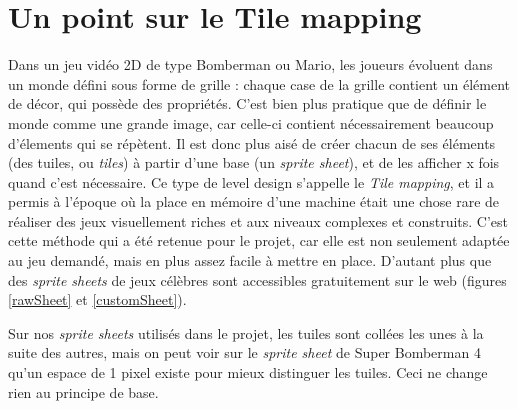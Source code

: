 \documentclass[a4paper,10pt]{report}
\begin{document}
\section{Un point sur le Tile mapping}
Dans un jeu vidéo 2D de type Bomberman ou Mario, les joueurs évoluent dans un monde défini sous forme de grille : chaque case de la grille contient un élément de décor, qui possède des propriétés. C'est bien plus pratique que de définir le monde comme une grande image, car celle-ci contient nécessairement beaucoup d'élements qui se répètent. Il est donc plus aisé de créer chacun de ses éléments (des tuiles, ou \textit{tiles}) à partir d'une base (un \textit{sprite sheet}), et de les afficher x fois quand c'est nécessaire. Ce type de level design s'appelle le \textit{Tile mapping}, et il a permis à l'époque où la place en mémoire d'une machine était une chose rare de réaliser des jeux visuellement riches et aux niveaux complexes et construits. C'est cette méthode qui a été retenue pour le projet, car elle est non seulement adaptée au jeu demandé, mais en plus assez facile à mettre en place. D'autant plus que des \textit{sprite sheets} de jeux célèbres sont accessibles gratuitement sur le web (figures \ref{rawSheet} et \ref{customSheet}).

Sur nos \textit{sprite sheets} utilisés dans le projet, les tuiles sont collées les unes à la suite des autres, mais on peut voir sur le \textit{sprite sheet} de Super Bomberman 4 qu'un espace de 1 pixel existe pour mieux distinguer les tuiles. Ceci ne change rien au principe de base.
\end{document}
